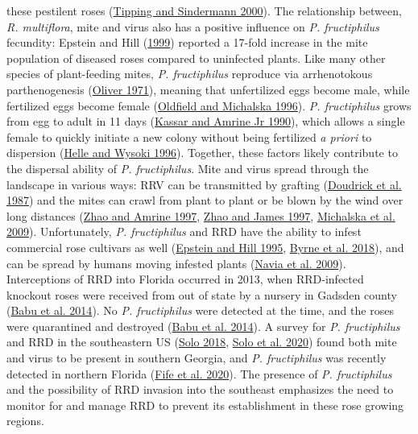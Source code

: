 \documentclass{ufdissertation}[overrideChapters] %
\begin{document}
{these pestilent roses (\protect\hyperlink{ref-Tipping2000}{Tipping and Sindermann 2000}). The relationship between, \emph{R. multiflora}, mite and virus also has a positive influence on \emph{P. fructiphilus} fecundity: Epstein and Hill (\protect\hyperlink{ref-Epstein1999}{1999}) reported a 17-fold increase in the mite population of diseased roses compared to uninfected plants. Like many other species of plant-feeding mites, \emph{P. fructiphilus} reproduce via arrhenotokous parthenogenesis (\protect\hyperlink{ref-Oliver1971}{Oliver 1971}), meaning that unfertilized eggs become male, while fertilized eggs become female (\protect\hyperlink{ref-Oldfield1996b}{Oldfield and Michalska 1996}). \emph{P. fructiphilus} grows from egg to adult in 11 days (\protect\hyperlink{ref-Kassar1990}{Kassar and Amrine Jr 1990}), which allows a single female to quickly initiate a new colony without being fertilized \emph{a priori} to dispersion (\protect\hyperlink{ref-Helle1996}{Helle and Wysoki 1996}). Together, these factors likely contribute to the dispersal ability of \emph{P. fructiphilus}. Mite and virus spread through the landscape in various ways: RRV can be transmitted by grafting (\protect\hyperlink{ref-Doudrick1987}{Doudrick et al. 1987}) and the mites can crawl from plant to plant or be blown by the wind over long distances (\protect\hyperlink{ref-Zhao1997b}{Zhao and Amrine 1997}, \protect\hyperlink{ref-Zhao1997a}{Zhao and James 1997}, \protect\hyperlink{ref-Michalska2009}{Michalska et al. 2009}). Unfortunately, \emph{P. fructiphilus} and RRD have the ability to infest commercial rose cultivars as well (\protect\hyperlink{ref-Epstein1995}{Epstein and Hill 1995}, \protect\hyperlink{ref-Byrne2018}{Byrne et al. 2018}), and can be spread by humans moving infested plants (\protect\hyperlink{ref-Navia2009}{Navia et al. 2009}). Interceptions of RRD into Florida occurred in 2013, when RRD-infected knockout roses were received from out of state by a nursery in Gadsden county (\protect\hyperlink{ref-Babu2014}{Babu et al. 2014}). No \emph{P. fructiphilus} were detected at the time, and the roses were quarantined and destroyed (\protect\hyperlink{ref-Babu2014}{Babu et al. 2014}). A survey for \emph{P. fructiphilus} and RRD in the southeastern US (\protect\hyperlink{ref-Solo2018}{Solo 2018}, \protect\hyperlink{ref-Solo2020}{Solo et al. 2020}) found both mite and virus to be present in southern Georgia, and \emph{P. fructiphilus} was recently detected in northern Florida (\protect\hyperlink{ref-Fife2020}{Fife et al. 2020}). The presence of \emph{P. fructiphilus} and the possibility of RRD invasion into the southeast emphasizes the need to monitor for and manage RRD to prevent its establishment in these rose growing regions.
\begin{figure}


\end{figure}}
\end{document}
